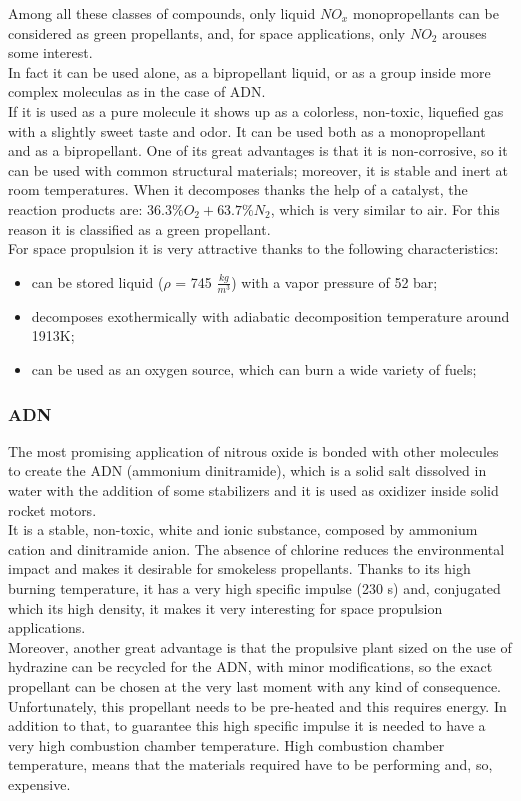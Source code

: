 \documentclass[a4paper]{report}
\begin{document}
Among all these classes of compounds, only liquid $NO_x$ monopropellants can be considered as green propellants, and, for space applications, only $NO_2$ arouses some interest. \\
In fact it can be used alone, as a bipropellant liquid, or as a group inside more complex moleculas as in the case of ADN. \\
If it is used as a pure molecule it shows up as a colorless, non-toxic, liquefied gas with a slightly sweet taste and odor. It can be used both as a monopropellant and as a bipropellant. One of its great advantages is that it is non-corrosive, so it can be used with common structural materials; moreover, it is stable and inert at room temperatures. When it decomposes thanks the help of a catalyst, the reaction products are: $36.3\%O_2 + 63.7\%N_2$, which is very similar to air. For this reason it is classified as a green propellant. \\
For space propulsion it is very attractive thanks to the following characteristics: 

\begin{itemize}
\item can be stored liquid ($\rho$ = 745 $\frac{kg}{m^3}$) with a vapor pressure of 52 bar;
\item decomposes exothermically with adiabatic decomposition temperature around 1913K;
\item can be used as an oxygen source, which can burn a wide variety of fuels;
\end{itemize}
 

\subsubsection{ADN}

The most promising application of nitrous oxide is bonded with other molecules to create the ADN (ammonium dinitramide), which is a solid salt dissolved in water with the addition of some stabilizers and it is used as oxidizer inside solid rocket motors.\\ 
It is a stable, non-toxic, white and ionic substance, composed by ammonium cation and dinitramide anion. The absence of chlorine reduces the environmental impact and makes it desirable for smokeless propellants. Thanks to its high burning temperature, it has a very high specific impulse (230 s) and, conjugated which its high density, it makes it very interesting for space propulsion applications.\\
Moreover, another great advantage is that the propulsive plant sized on the use of hydrazine can be recycled for the ADN, with minor modifications, so the exact propellant can be chosen at the very last moment with any kind of consequence. \\
Unfortunately, this propellant needs to be pre-heated and this requires energy. In addition to that, to guarantee this high specific impulse it is needed to have a very high combustion chamber temperature. High combustion chamber temperature, means that the materials required have to be performing and, so, expensive. \\ 
\end{document}
